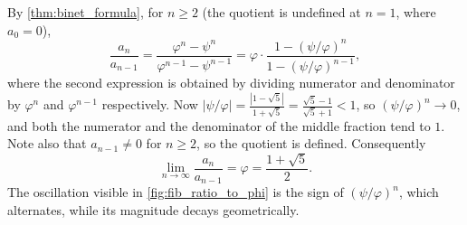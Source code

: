 \begin{exercisesolution*}
\label{sol:ch1_list_e}
By \cref{thm:binet_formula}, for $n \ge 2$ (the quotient is undefined at $n = 1$, where $a_0 = 0$),
\[
    \frac{a_n}{a_{n-1}} = \frac{\varphi^n - \psi^n}{\varphi^{n-1} - \psi^{n-1}} = \varphi \cdot \frac{1 - (\psi/\varphi)^n}{1 - (\psi/\varphi)^{n-1}},
\]
where the second expression is obtained by dividing numerator and denominator by $\varphi^n$ and $\varphi^{n-1}$ respectively. Now $\left|\psi/\varphi\right| = \frac{|1 - \sqrt{5}|}{1 + \sqrt{5}} = \frac{\sqrt{5}-1}{\sqrt{5}+1} < 1$, so $(\psi/\varphi)^n \to 0$, and both the numerator and the denominator of the middle fraction tend to $1$. Note also that $a_{n-1} \neq 0$ for $n \ge 2$, so the quotient is defined. Consequently
\[
    \lim_{n \to \infty} \frac{a_n}{a_{n-1}} = \varphi = \frac{1 + \sqrt{5}}{2}.
\]
The oscillation visible in \cref{fig:fib_ratio_to_phi} is the sign of $(\psi/\varphi)^n$, which alternates, while its magnitude decays geometrically.
\end{exercisesolution*}

